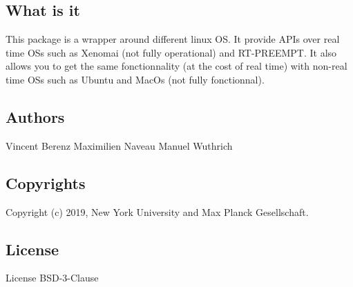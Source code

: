 \subsection*{What is it}

This package is a wrapper around different linux OS. It provide A\+P\+Is over real time O\+Ss such as Xenomai (not fully operational) and R\+T-\/\+P\+R\+E\+E\+M\+PT. It also allows you to get the same fonctionnality (at the cost of real time) with non-\/real time O\+Ss such as Ubuntu and Mac\+Os (not fully fonctionnal).

\subsection*{Authors}

Vincent Berenz Maximilien Naveau Manuel Wuthrich

\subsection*{Copyrights}

Copyright (c) 2019, New York University and Max Planck Gesellschaft.

\subsection*{License}

License B\+S\+D-\/3-\/\+Clause 